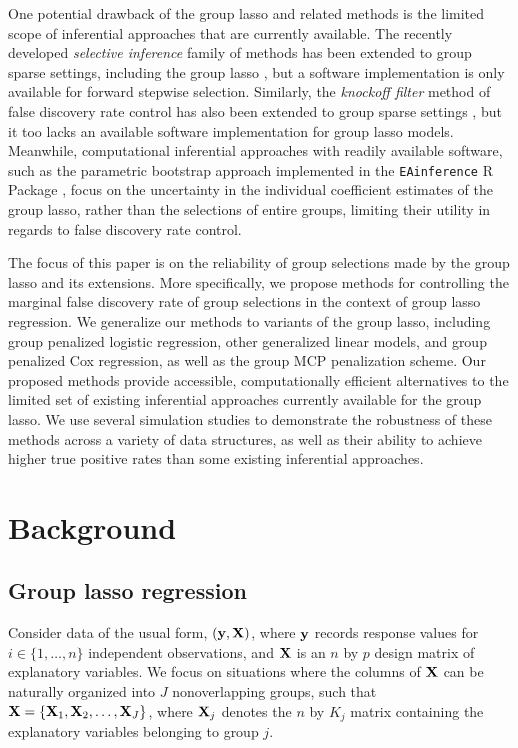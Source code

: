 One potential drawback of the group lasso and related methods is the limited scope of inferential approaches that are currently available. The recently developed \textit{selective inference} \citep{Selective_Inference} family of methods has been extended to group sparse settings, including the group lasso \citep{Yang2016}, but a software implementation is only available for forward stepwise selection. Similarly, the \textit{knockoff filter} method of false discovery rate control \citep{barber2015, candes2018} has also been extended to group sparse settings \citep{Dai2016}, but it too lacks an available software implementation for group lasso models. Meanwhile, computational inferential approaches with readily available software, such as the parametric bootstrap approach implemented in the {\tt EAinference} R Package \citep{Zhou2017}, focus on the uncertainty in the individual coefficient estimates of the group lasso, rather than the selections of entire groups, limiting their utility in regards to false discovery rate control.

The focus of this paper is on the reliability of group selections made by the group lasso and its extensions. More specifically, we propose methods for controlling the marginal false discovery rate of group selections in the context of group lasso regression. We generalize our methods to variants of the group lasso, including group penalized logistic regression, other generalized linear models, and group penalized Cox regression, as well as the group MCP penalization scheme. Our proposed methods provide accessible, computationally efficient alternatives to the limited set of existing inferential approaches currently available for the group lasso. We use several simulation studies to demonstrate the robustness of these methods across a variety of data structures, as well as their ability to achieve higher true positive rates than some existing inferential approaches. 

\section{Background}

\subsection{Group lasso regression}

Consider data of the usual form, $(\mathbf{y}, \mathbf{X})$, where $\mathbf{y}$ records response values for $i \in \{1, \ldots, n\}$ independent observations, and $\mathbf{X}$ is an $n$ by $p$ design matrix of explanatory variables. We focus on situations where the columns of $\mathbf{X}$ can be naturally organized into $J$ nonoverlapping groups, such that $\mathbf{X} = \{\mathbf{X}_1, \mathbf{X}_2, \ldots, \mathbf{X}_J\}$, where $\mathbf{X}_j$ denotes the $n$ by $K_j$ matrix containing the explanatory variables belonging to group $j$. 


